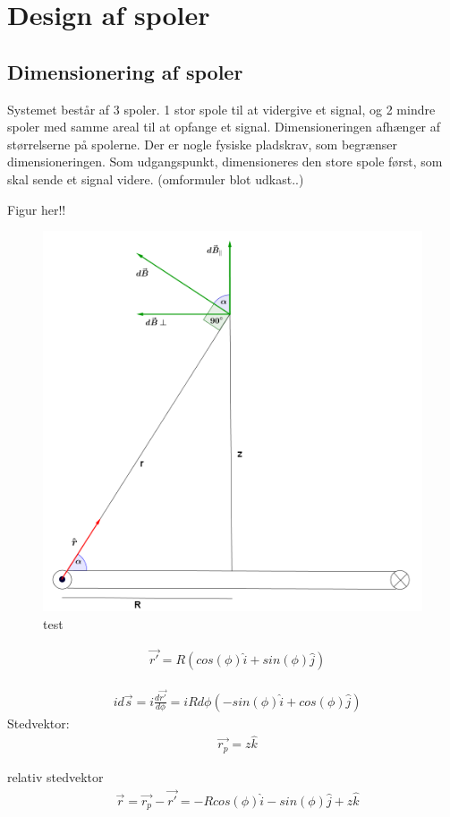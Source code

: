 \section{Design af spoler}\label{sec:sec_spole_design}

\subsection{Dimensionering af spoler}

Systemet består af 3 spoler. 1 stor spole til at vidergive et signal, og 2 mindre spoler med samme areal til at opfange et signal. Dimensioneringen afhænger af størrelserne på spolerne. Der er nogle fysiske pladskrav, som begrænser dimensioneringen. Som udgangspunkt, dimensioneres den store spole først, som skal sende et signal videre. (omformuler blot udkast..)

Figur her!!

\begin{figure}[h!]
	\centering
	\includegraphics[width=.6\textwidth]{billeder/B_felt.png}
	\caption{test}
	\label{fig:BiotSavart1}
\end{figure}

 \begin{align}
 	&\vec{r'}=R(cos(\phi)\hat{i}+sin(\phi)\hat{j})
 \end{align}

\begin{align}
	&id\vec{s}=i\frac{d\vec{r'}}{d\phi}=i R d\phi (-sin(\phi)\hat{i}+cos(\phi)\hat{j})
\end{align}
Stedvektor:
\begin{align}
	&\vec{r_p}=z\hat{k}
\end{align}

relativ stedvektor
\begin{align}
	&\vec{r}=\vec{r_p}-\vec{r'}=-R cos(\phi)\hat{i}-sin(\phi)\hat{j}+z\hat{k}
\end{align}

